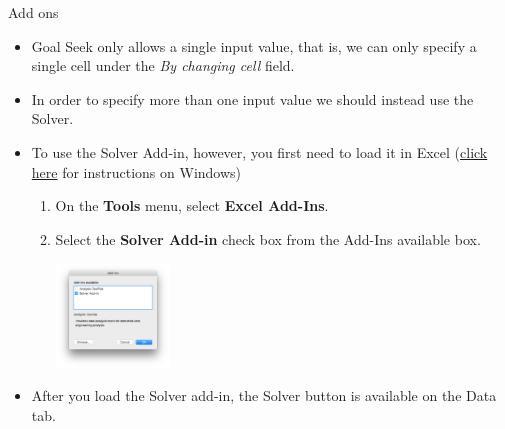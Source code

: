 \documentclass[xcolor=svgnames]{beamer}
\begin{document}
\begin{frame}{Add ons}
\begin{itemize}
\item Goal Seek only allows a single input value, that is, we can only specify a single cell under the {\it By changing cell} field.
\medskip
\item In order to specify more than one input value we should instead use the Solver.
\medskip
\item To use the Solver Add-in, however, you first need to load it in Excel (\href{https://support.office.com/en-us/article/load-the-solver-add-in-in-excel-612926fc-d53b-46b4-872c-e24772f078ca\#OfficeVersion=Windows}{click here} for instructions on Windows)

\begin{enumerate}
\item On the {\bf Tools} menu, select {\bf Excel Add-Ins}.
\item Select the {\bf Solver Add-in} check box from the Add-Ins available box.
\begin{center}
\includegraphics[width=0.25\textwidth]{solveraddin}
\end{center}



\end{enumerate}
\item After you load the Solver add-in, the Solver button is available on the Data tab.
\end{itemize}
\end{frame}
\end{document}
